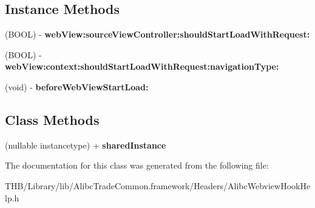 \subsection*{Instance Methods}
\begin{DoxyCompactItemize}
\item 
\mbox{\label{interface_alibc_webview_hook_help_a595ae595f69b4432ba6b060453ba375d}} 
(B\+O\+OL) -\/ {\bfseries web\+View\+:source\+View\+Controller\+:should\+Start\+Load\+With\+Request\+:}
\item 
\mbox{\label{interface_alibc_webview_hook_help_a6a0a5c7ee690d45b00eb6491f6afd172}} 
(B\+O\+OL) -\/ {\bfseries web\+View\+:context\+:should\+Start\+Load\+With\+Request\+:navigation\+Type\+:}
\item 
\mbox{\label{interface_alibc_webview_hook_help_a6879374384e20b14c267261259f88502}} 
(void) -\/ {\bfseries before\+Web\+View\+Start\+Load\+:}
\end{DoxyCompactItemize}
\subsection*{Class Methods}
\begin{DoxyCompactItemize}
\item 
\mbox{\label{interface_alibc_webview_hook_help_a29d2684c7b04a849c22560fdb1bd0faf}} 
(nullable instancetype) + {\bfseries shared\+Instance}
\end{DoxyCompactItemize}


The documentation for this class was generated from the following file\+:\begin{DoxyCompactItemize}
\item 
T\+H\+B/\+Library/lib/\+Alibc\+Trade\+Common.\+framework/\+Headers/Alibc\+Webview\+Hook\+Help.\+h\end{DoxyCompactItemize}
